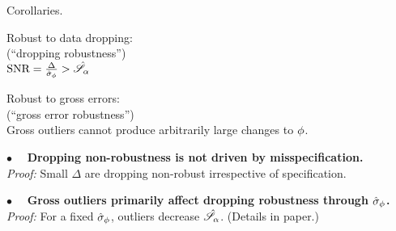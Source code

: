
\begin{frame}[t]{Corollaries.}
%
\begin{minipage}[t]{0.45\textwidth}
\begin{center}
    Robust to data dropping:\\
    (``dropping robustness'')\\
    \vspace{1em}
    $\textrm{SNR} = \frac{\Delta}{\hat\sigma_{\phi}} > \hat{\mathscr{S}}_\alpha$
\end{center}
\end{minipage}
%
\begin{minipage}[t]{0.45\textwidth}
\begin{center}
    Robust to gross errors:\\
    (``gross error robustness'')\\
    \vspace{1em}
    Gross outliers cannot produce
    arbitrarily large changes to $\phi$.
\end{center}
\end{minipage}

\vspace{1em}
\hrulefill

\vspace{1em} $\bullet\quad$
\textbf{Dropping non-robustness is not driven by misspecification.\\}
\textit{Proof: }
Small $\Delta$ are dropping non-robust irrespective of specification.

\vspace{1em} $\bullet\quad$
\textbf{Gross outliers primarily affect dropping robustness through $\hat\sigma_{\phi}$.\\}
\textit{Proof: }
For a fixed $\hat\sigma_{\phi}$, outliers decrease $\hat{\mathscr{S}}_\alpha$.
(Details in paper.)

\end{frame}



